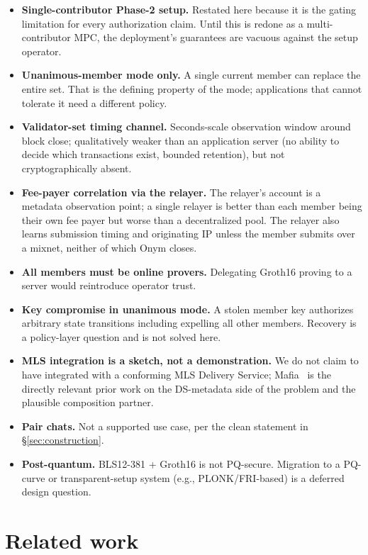 \documentclass[11pt,a4paper]{article}
\begin{document}
\begin{itemize}
  \item \textbf{Single-contributor Phase-2 setup.} Restated here because it is the gating limitation for every authorization claim. Until this is redone as a multi-contributor MPC, the deployment's guarantees are vacuous against the setup operator.
  \item \textbf{Unanimous-member mode only.} A single current member can replace the entire set. That is the defining property of the mode; applications that cannot tolerate it need a different policy.
  \item \textbf{Validator-set timing channel.} Seconds-scale observation window around block close; qualitatively weaker than an application server (no ability to decide which transactions exist, bounded retention), but not cryptographically absent.
  \item \textbf{Fee-payer correlation via the relayer.} The relayer's account is a metadata observation point; a single relayer is better than each member being their own fee payer but worse than a decentralized pool. The relayer also learns submission timing and originating IP unless the member submits over a mixnet, neither of which Onym closes.
  \item \textbf{All members must be online provers.} Delegating Groth16 proving to a server would reintroduce operator trust.
  \item \textbf{Key compromise in unanimous mode.} A stolen member key authorizes arbitrary state transitions including expelling all other members. Recovery is a policy-layer question and is not solved here.
  \item \textbf{MLS integration is a sketch, not a demonstration.} We do not claim to have integrated with a conforming MLS Delivery Service; Mafia~\cite{mafia2025} is the directly relevant prior work on the DS-metadata side of the problem and the plausible composition partner.
  \item \textbf{Pair chats.} Not a supported use case, per the clean statement in \S\ref{sec:construction}.
  \item \textbf{Post-quantum.} BLS12-381 + Groth16 is not PQ-secure. Migration to a PQ-curve or transparent-setup system (e.g., PLONK/FRI-based) is a deferred design question.
\end{itemize}

\section{Related work}
\end{document}
